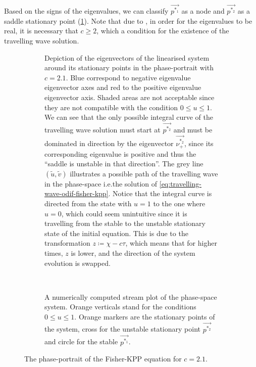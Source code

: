 Based on the signs of the eigenvalues, we can classify \(\vec{p^{*_1}}\) as a node and \(\vec{p^{*_2}}\) as a saddle
    stationary point (\cref{fig:phase-portrait-kpp-fisher}).
Note that due to , in order for the eigenvalues to be real, it is necessary that
    \(c \ge 2\), which a condition for the existence of the travelling wave solution.

\begin{figure*}[htbp]
    \centering
    \begin{subfigure}[t]{0.9\textwidth}
    \centering
    
    \caption{
        Depiction of the eigenvectors of the linearised system around its stationary points in the phase-portrait with
        \(c=2.1\).
        Blue correspond to negative eigenvalue eigenvector axes and red to the positive eigenvalue eigenvector axis.
        Shaded areas are not acceptable since they are not compatible with the condition \(0\le u \le 1\).
        We can see that the only possible integral curve of the travelling wave solution must start at \(\vec{p^{*_2}}\)
        and must be dominated in direction by the eigenvector \(\vec{\nu^{*_2}_+}\), since its corresponding eigenvalue is
            positive and thus the ``saddle is unstable in that direction''.
        The grey line \((\tilde{u}, \tilde{v})\) illustrates a possible path of the travelling wave in the phase-space
            i.e.\@ the solution of \cref{eq:travelling-wave-odif-fisher-kpp}.
        Notice that the integral curve is directed from the state with \(u = 1\) to the one where \(u = 0\),
            which could seem unintuitive since it is travelling from the stable to the unstable stationary state of the
            initial equation.
        This is due to the transformation \(z \coloneqq \chi - c \tau\), which means that for higher times, \(z\) is
            lower, and the direction of the system evolution is swapped.
        }
    \label{fig:phase-portrait-kpp-fisher}
    \end{subfigure}
    \\
    \begin{subfigure}[t]{0.9\textwidth}
        \centering
        \caption{
            A numerically computed stream plot of the phase-space system. Orange verticals stand for the conditions \(0
            \le u \le 1\). Orange markers are the stationary points of the system, cross for the unstable stationary
            point \(\vec{p^{*_2}}\) and circle for the stable \(\vec{p^{*_1}}\).
            }
        \label{fig:phase-portrait-kpp-fisher-numerical}
    \end{subfigure}%
    \caption{%
        The phase-portrait of the Fisher-\ac{KPP} equation for \(c = 2.1\).
        \label{fig:phase-portrait-with-linearisation}
    }
\end{figure*}

